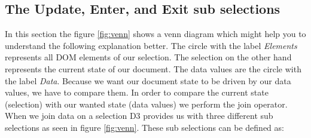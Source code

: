 \documentclass{bioinfo}
\begin{document}
\subsection{The Update, Enter, and Exit sub selections}
In this section the figure \ref{fig:venn} shows a venn diagram which might help you to understand the following explanation better.
The circle with the label \textit{Elements} represents all DOM elements of our selection. The selection on the other hand represents the current state of our document.
The data values are the circle with the label \textit{Data}.
Because we want our document state to be driven by our data values, we have to compare them. 
In order to compare the current state (selection) with our wanted state (data values) we perform the join operator.
When we join data on a selection D3 provides us with three different sub selections as seen in figure \ref{fig:venn}.
These sub selections can be defined as:
\end{document}
